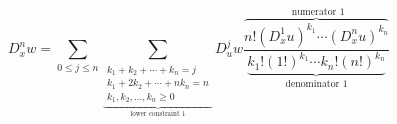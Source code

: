 \begin{equation*}
D^n_xw = \sum_{0\le j\le n} \sum_{\underbrace{
    \substack{\scriptstyle
      k_1+k_2+\cdots+k_n=j \\
      \scriptstyle
      k_1+2k_2+\cdots+nk_n=n \\
      \scriptstyle
      k_1,k_2,\ldots,k_n\ge0 }}_{\mbox{lower constraint
        1}}} D^j_u w
  \frac{\overbrace{n!  {(D^1_x u)}^{k_1} \cdots
      {(D^n_x u)}^{k_n}} ^{\mbox{ numerator 1}}}
  {\underbrace{k_1!{(1!)}^{k_1}
    \cdots k_n!{(n!)}^{k_n}}_{\mbox{denominator 1}}}
\end{equation*}

